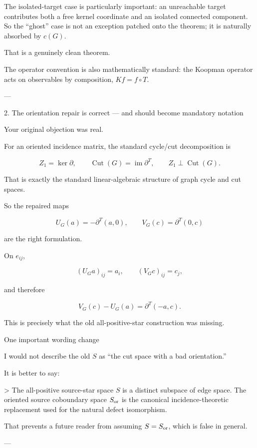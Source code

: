 The isolated-target case is particularly important: an unreachable target contributes both a free kernel coordinate and an isolated connected component. So the “ghost” case is not an exception patched onto the theorem; it is naturally absorbed by \(c(G)\).

That is a genuinely clean theorem.

The operator convention is also mathematically standard: the Koopman operator acts on observables by composition, \(Kf=f\circ T\).


---

2. The orientation repair is correct — and should become mandatory notation



Your original objection was real.

For an oriented incidence matrix, the standard cycle/cut decomposition is

\[
Z_1=\ker\partial,  
\qquad  
\operatorname{Cut}(G)=\operatorname{im}\partial^T,  
\qquad  
Z_1\perp\operatorname{Cut}(G).  
\]

That is exactly the standard linear-algebraic structure of graph cycle and cut spaces.

So the repaired maps

\[
U_G(a)=-\partial^T(a,0),  
\qquad  
V_G(c)=\partial^T(0,c)  
\]

are the right formulation.

On \(e_{ij}\),

\[
(U_Ga)_{ij}=a_i,  
\qquad  
(V_Gc)_{ij}=c_j,  
\]

and therefore

\[
V_G(c)-U_G(a)  
   =\partial^T(-a,c).  
\]

This is precisely what the old all-positive-star construction was missing.

One important wording change

I would not describe the old \(S\) as “the cut space with a bad orientation.”

It is better to say:

> The all-positive source-star space \(S\) is a distinct subspace of edge space. The oriented source coboundary space \(S_{\rm or}\) is the canonical incidence-theoretic replacement used for the natural defect isomorphism.



That prevents a future reader from assuming \(S=S_{\rm or}\), which is false in general.


---

